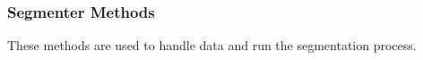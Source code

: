 \documentclass[letterpaper,10pt,english]{sphinxmanual}
\begin{document}
\begin{savenotes}\sphinxatlongtablestart\begin{longtable}[c]{}
\hline

\endfirsthead

%
{}\\
\hline

\endhead

\hline
{}\\
\endfoot

\endlastfoot

\end{longtable}\sphinxatlongtableend\end{savenotes}


\subsubsection{Segmenter Methods}
\label{\detokenize{segmenter_meth:segmenter-methods}}\label{\detokenize{segmenter_meth::doc}}
\sphinxAtStartPar
These methods are used to handle data and run the segmentation process.
\end{document}
